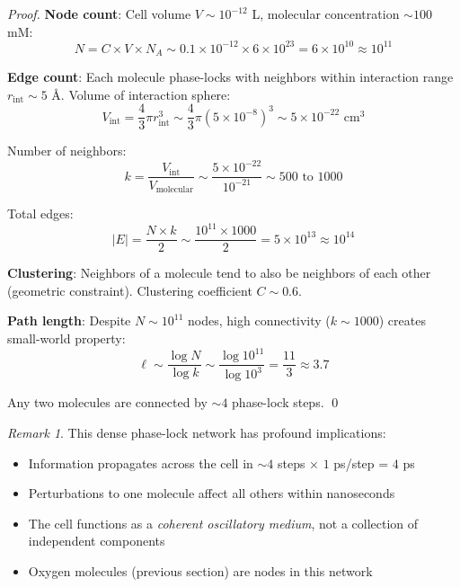 \documentclass[11pt]{article}
\theoremstyle{remark}
\newtheorem{remark}[theorem]{Remark}
\begin{document}
\begin{proof}
\textbf{Node count}: Cell volume $V \sim 10^{-12}$ L, molecular concentration $\sim 100$ mM:
\begin{equation}
N = C \times V \times N_A \sim 0.1 \times 10^{-12} \times 6 \times 10^{23} = 6 \times 10^{10} \approx 10^{11}
\end{equation}

\textbf{Edge count}: Each molecule phase-locks with neighbors within interaction range $r_{\text{int}} \sim 5$ Å. Volume of interaction sphere:
\begin{equation}
V_{\text{int}} = \frac{4}{3} \pi r_{\text{int}}^3 \sim \frac{4}{3} \pi (5 \times 10^{-8})^3 \sim 5 \times 10^{-22} \text{ cm}^3
\end{equation}

Number of neighbors:
\begin{equation}
k = \frac{V_{\text{int}}}{V_{\text{molecular}}} \sim \frac{5 \times 10^{-22}}{10^{-21}} \sim 500 \text{ to } 1000
\end{equation}

Total edges:
\begin{equation}
|E| = \frac{N \times k}{2} \sim \frac{10^{11} \times 1000}{2} = 5 \times 10^{13} \approx 10^{14}
\end{equation}

\textbf{Clustering}: Neighbors of a molecule tend to also be neighbors of each other (geometric constraint). Clustering coefficient $C \sim 0.6$.

\textbf{Path length}: Despite $N \sim 10^{11}$ nodes, high connectivity ($k \sim 1000$) creates small-world property:
\begin{equation}
\ell \sim \frac{\log N}{\log k} \sim \frac{\log 10^{11}}{\log 10^3} = \frac{11}{3} \approx 3.7
\end{equation}

Any two molecules are connected by $\sim 4$ phase-lock steps. \qed
\end{proof}

\begin{remark}
This dense phase-lock network has profound implications:
\begin{itemize}
\item Information propagates across the cell in $\sim 4$ steps × $1$ ps/step = $4$ ps
\item Perturbations to one molecule affect all others within nanoseconds
\item The cell functions as a \textit{coherent oscillatory medium}, not a collection of independent components
\item Oxygen molecules (previous section) are nodes in this network
\end{itemize}
\end{remark}
\end{document}
